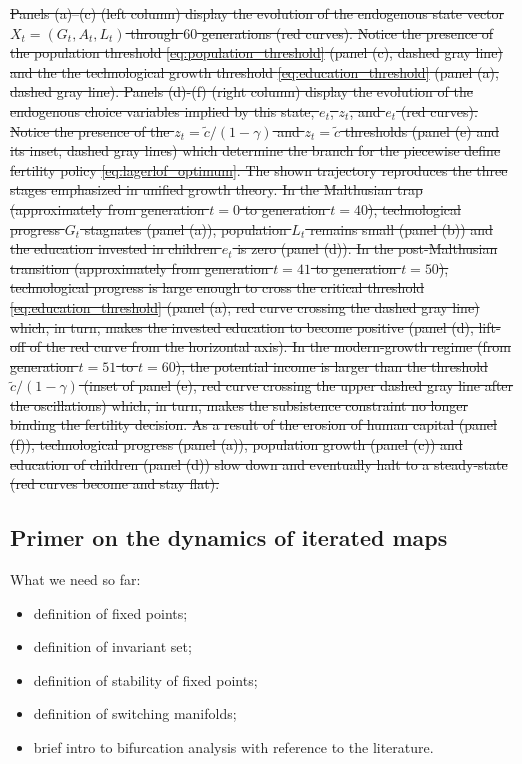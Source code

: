 \documentclass[a4paper,fleqn]{cas-sc}
\begin{document}
%
\sout{Panels (a)--(c) (left column) display the evolution of the endogenous state vector $X_t=(G_t,A_t,L_t)$ through $60$ generations (red curves).
Notice the presence of the population threshold \eqref{eq:population_threshold} (panel (c), dashed gray line) and the the technological growth threshold \eqref{eq:education_threshold} (panel (a), dashed gray line).
Panels (d)-(f) (right column) display the evolution of the endogenous choice variables implied by this state, $e_t$, $z_t$, and $e_t$ (red curves).
Notice the presence of the $z_t=\tilde c/(1-\gamma)$ and  $z_t=\tilde c$ thresholds (panel (e) and its inset, dashed gray lines) which determine the branch for the piecewise define fertility policy \eqref{eq:lagerlof_optimum}.
The shown trajectory reproduces the three stages emphasized in unified growth theory. 
In the Malthusian trap (approximately from generation $t=0$ to generation $t=40$), technological progress $G_t$ stagnates (panel (a)), population $L_t$ remains small (panel (b)) and the education invested in children $e_t$ is zero (panel (d)).
In the post-Malthusian transition (approximately from generation $t=41$ to generation $t=50$), technological progress is large enough to cross the critical threshold \eqref{eq:education_threshold} (panel (a), red curve crossing the dashed gray line) which, in turn, makes the invested education to become positive (panel (d), lift-off of the red curve from the horizontal axis). 
In the modern-growth regime (from generation $t=51$ to $t=60$), the potential income is larger than the threshold $\tilde c/(1-\gamma)$ (inset of panel (e), red curve crossing the upper dashed gray line after the oscillations) which, in turn, makes the subsistence constraint no longer binding the fertility decision. 
As a result of the erosion of human capital (panel (f)), technological progress (panel (a)), population growth (panel (c)) and education of children (panel (d)) slow down and eventually halt to a steady-state (red curves become and stay flat).}



\subsection{Primer on the dynamics of iterated maps}\label{subsec:dynamical_systems_theory}
What we need so far:
\begin{itemize}
    \item definition of fixed points;
    \item definition of invariant set;
    \item definition of stability of fixed points;
    \item definition of switching manifolds;
    \item brief intro to bifurcation analysis with reference to the literature.
\end{itemize}
%
\end{document}

